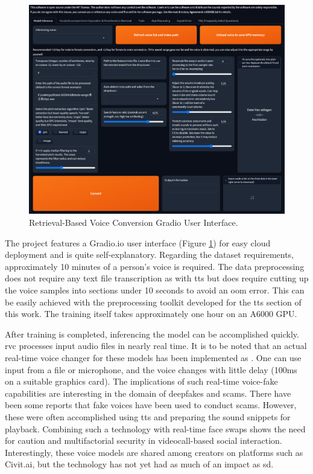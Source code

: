 \documentclass[
  a4paper,  %
  twoside,  %
  bibliography=totoc,
  headsepline,
  cleardoublepage=empty,
  parskip=half,
  draft=false
]{scrbook}
\begin{document}
\begin{figure}[h]
  \centering
  \includegraphics[width=1\textwidth]{./graphics/RVC-UI.png}
  \caption{Retrieval-Based Voice Conversion Gradio User Interface.}
  \label{fig:rvc-gradio}
\end{figure}

The project features a Gradio.io user interface (Figure \ref{fig:rvc-gradio}) for easy cloud deployment and is quite self-explanatory. Regarding the dataset requirements, approximately 10 minutes of a person's voice is required. The data preprocessing does not require any text file transcription as with \gls{tts} but does require cutting up the voice samples into sections under 10 seconds to avoid an \gls{oom} error. This can be easily achieved with the preprocessing toolkit developed for the \gls{tts} section of this work. The training itself takes approximately one hour on an A6000 GPU.

After training is completed, inferencing the model can be accomplished quickly. \gls{rvc} processes input audio files in nearly real time. It is to be noted that an actual real-time voice changer for these models has been implemented as  \cite{WokadaVoicechangerVoice}. One can use input from a file or microphone, and the voice changes with little delay (100ms on a suitable graphics card). The implications of such real-time voice-fake capabilities are interesting in the domain of deepfakes and scams. There have been some reports that fake voices have been used to conduct scams. However, these were often accomplished using \gls{tts} and preparing the sound snippets for playback. Combining such a technology with real-time face swaps shows the need for caution and multifactorial security in videocall-based social interaction. Interestingly, these voice models are shared among creators on platforms such as Civit.ai, but the technology has not yet had as much of an impact as \gls{sd}.
\end{document}

